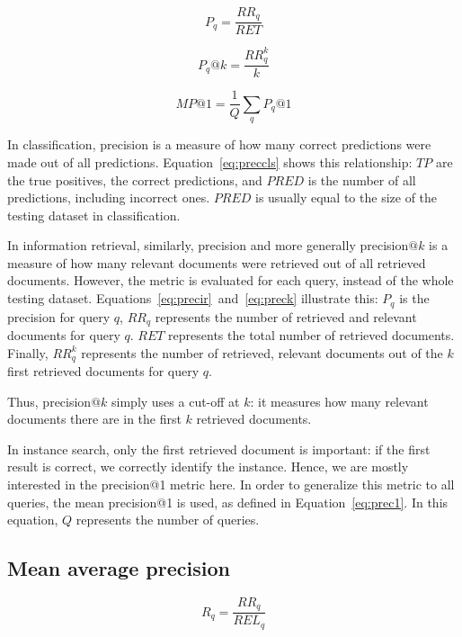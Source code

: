 \begin{equation}\label{eq:precir}
P_q = \frac{RR_q}{RET}
\end{equation}

\begin{equation}\label{eq:preck}
P_q@k = \frac{RR^k_q}{k}
\end{equation}

\begin{equation}\label{eq:prec1}
MP@1 = \frac{1}{Q} \sum_q P_q@1
\end{equation}

In classification, precision is a measure of how many correct predictions
were made out of all predictions. Equation~\ref{eq:preccls} shows this
relationship: $TP$ are the true positives, the correct predictions,
and $PRED$ is the number of all predictions, including incorrect ones.
$PRED$ is usually equal to the size of the testing dataset in classification.

In information retrieval, similarly,
precision and more generally precision$@k$ is a measure of how many
relevant documents were retrieved out of all retrieved documents.
However, the metric is evaluated for each query, instead of the whole
testing dataset.
Equations~\ref{eq:precir}~and~\ref{eq:preck} illustrate this: $P_q$ is
the precision for query $q$, $RR_q$ represents the number of retrieved
and relevant documents for query $q$.
$RET$ represents the total number of retrieved documents. Finally, $RR^k_q$
represents the number of retrieved, relevant documents out of the $k$ first
retrieved documents for query $q$.

Thus, precision$@k$ simply uses a cut-off at $k$: it measures how many
relevant documents there are in the first $k$ retrieved documents.

In instance search, only the first retrieved document is important:
if the first result is correct, we correctly identify the instance.
Hence, we are mostly interested in the precision@1 metric here.
In order to generalize this metric to all queries, the mean precision@1
is used, as defined in Equation~\ref{eq:prec1}. In this equation,
$Q$ represents the number of queries.

\subsection{Mean average precision}
\begin{equation}\label{eq:recall}
R_q = \frac{RR_q}{REL_q}
\end{equation}

